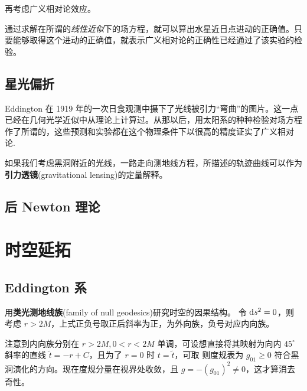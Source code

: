 再考虑广义相对论效应。

通过求解在所谓的\textit{线性近似}下的场方程，就可以算出水星近日点进动的正确值。只要能够取得这个进动的正确值，就表示广义相对论的正确性已经通过了该实验的检验。



\subsection{星光偏折}
Eddington 在 1919 年的一次日食观测中摄下了光线被引力“弯曲”的图片。这一点已经在几何光学近似中从理论上计算过。从那以后，用太阳系的种种检验对场方程作了所谓的，这些预测和实验都在这个物理条件下以很高的精度证实了广义相对论.

如果我们考虑黑洞附近的光线，一路走向测地线方程，所描述的轨迹曲线可以作为\textbf{引力透镜}(gravitational lensing)的定量解释。

\subsection{后 Newton 理论}


\section{时空延拓}

\subsection{Eddington 系}

用\textbf{类光测地线族}(family of null geodesics)研究时空的因果结构。
令 $\dd s^2=0$，则
考虑 $r>2M$，上式正负号取正后斜率为正，为外向族，负号对应内向族。

注意到内向族分别在 $r>2M,0<r<2M$ 单调，可设想直接将其映射为向内 $45^\circ$ 斜率的直线 $\tilde t=-r+C$，且为了 $r=0$ 时 $t=\tilde t$，可取
则度规表为
$g_{01}\geqslant 0$ 符合黑洞演化的方向。现在度规分量在视界处收敛，且 $g=-(g_{01})^2\ne 0$，这才算消去奇性。


